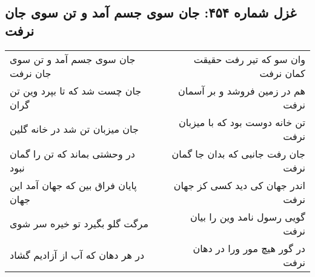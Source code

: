 \begin{center}
\section*{غزل شماره ۴۵۴: جان سوی جسم آمد و تن سوی جان نرفت}
\label{sec:0454}
\begin{longtable}{l p{0.5cm} r}
جان سوی جسم آمد و تن سوی جان نرفت
&&
وان سو که تیر رفت حقیقت کمان نرفت
\\
جان چست شد که تا بپرد وین تن گران
&&
هم در زمین فروشد و بر آسمان نرفت
\\
جان میزبان تن شد در خانه گلین
&&
تن خانه دوست بود که با میزبان نرفت
\\
در وحشتی بماند که تن را گمان نبود
&&
جان رفت جانبی که بدان جا گمان نرفت
\\
پایان فراق بین که جهان آمد این جهان
&&
اندر جهان کی دید کسی کز جهان نرفت
\\
مرگت گلو بگیرد تو خیره سر شوی
&&
گویی رسول نامد وین را بیان نرفت
\\
در هر دهان که آب از آزادیم گشاد
&&
در گور هیچ مور ورا در دهان نرفت
\\
\end{longtable}
\end{center}
